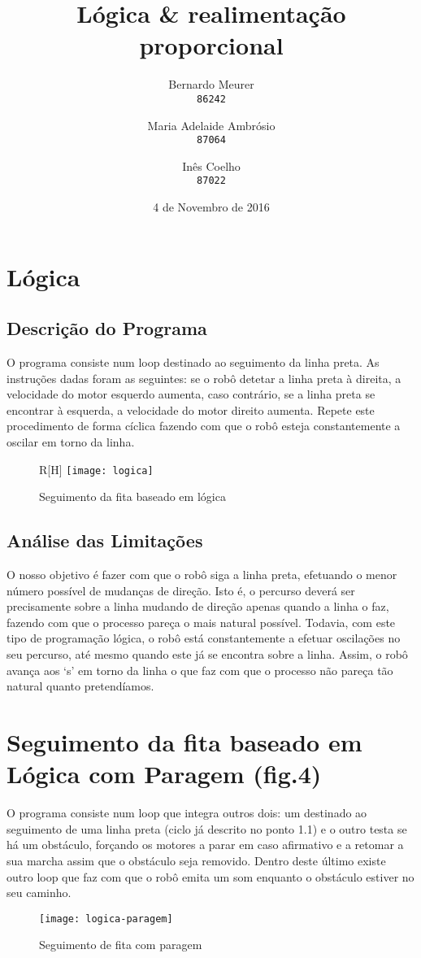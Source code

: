 \documentclass{article}
\title{Lógica \& realimentação proporcional}
\date{4 de Novembro de 2016}
\author{Bernardo Meurer\\
        \texttt{86242}
        \and
        Maria Adelaide Ambrósio\\
        \texttt{87064}
        \and
        Inês Coelho\\
        \texttt{87022}}
\begin{document}
\maketitle
\newpage
\section{Lógica}
\subsection{Descrição do Programa}
O programa consiste num loop destinado ao seguimento da linha preta. As
instruções dadas foram as seguintes: se o robô detetar a linha preta à direita,
a velocidade do motor esquerdo aumenta, caso contrário, se a linha preta se
encontrar à esquerda, a velocidade do motor direito aumenta. Repete este
procedimento de forma cíclica fazendo com que o robô esteja constantemente a
oscilar em torno da linha.
\begin{wrapfigure}{R}[H]
    \centering
    \texttt{[image: logica]}
    \caption{Seguimento da fita baseado em lógica}
\end{wrapfigure}
\subsection{Análise das Limitações}
O nosso objetivo é fazer com que o robô siga a linha preta, efetuando o menor
número possível de mudanças de direção. Isto é, o percurso deverá ser
precisamente sobre a linha mudando de direção apenas quando a linha o faz,
fazendo com que o processo pareça o mais natural possível. Todavia, com este
tipo de programação lógica, o robô está constantemente a efetuar oscilações no
seu percurso, até mesmo quando este já se encontra sobre a linha. Assim, o
robô avança aos `s' em torno da linha o que faz com que o processo não pareça
tão natural quanto pretendíamos.
\section{Seguimento da fita baseado em Lógica com Paragem (fig.4)}
O programa consiste num loop que integra outros dois: um destinado ao seguimento
de uma linha preta (ciclo já descrito no ponto 1.1) e o outro testa se há um
obstáculo, forçando os motores a parar em caso afirmativo e a retomar a sua
marcha assim que o obstáculo seja removido. Dentro deste último existe outro
loop que faz com que o robô emita um som enquanto o obstáculo estiver no seu
caminho.
\begin{figure}[H]
    \centering
    \texttt{[image: logica-paragem]}
    \caption{Seguimento de fita com paragem}
\end{figure}
\end{document}
